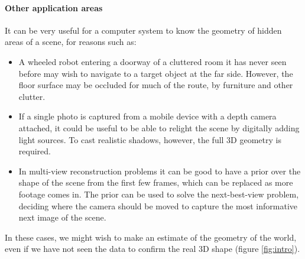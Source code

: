 \documentclass[10pt,twocolumn,letterpaper]{article}
\makeatletter
\renewcommand*{\eg}{e.g.\@\xspace}
\newcommand*{\ea}{et al.\@\xspace}
\makeatother
\begin{document}
\paragraph{Other application areas}
It can be very useful for a computer system to know the geometry of hidden areas of a scene, for reasons such as:
\begin{itemize}
\item A wheeled robot entering a doorway of a cluttered room it has never seen before may wish to navigate to a target object at the far side. However, the floor surface may be occluded for much of the route, by furniture and other clutter.
\item If a single photo is captured from a mobile device with a depth camera attached, it could be useful to be able to relight the scene by digitally adding light sources. To cast realistic shadows, however, the full 3D geometry is required.
\item In multi-view reconstruction problems it can be good to have a prior over the shape of the scene from the first few frames, which can be replaced as more footage comes in. The prior can be used to solve the next-best-view problem, deciding where the camera should be moved to capture the most informative next image of the scene.
\end{itemize}

In these cases, we might wish to make an estimate of the geometry of the world, even if we have not seen the data to confirm the real 3D shape (figure \ref{fig:intro}).

\end{document}
